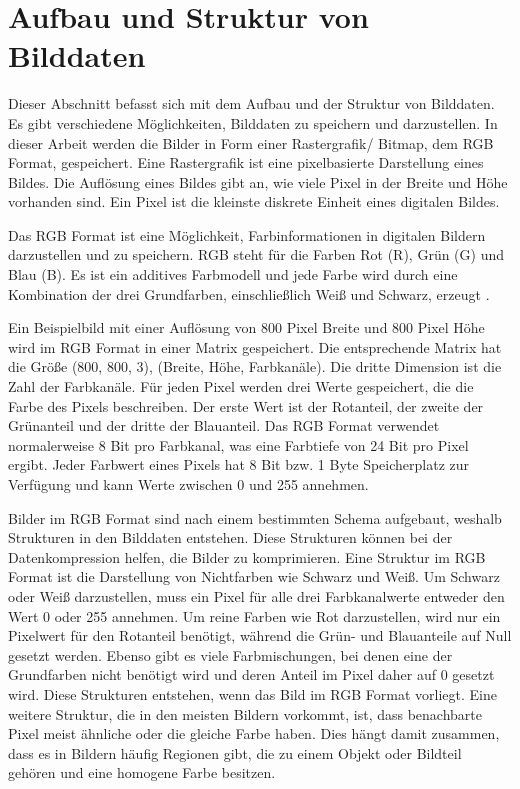 \documentclass[conference]{IEEEtran}
\begin{document}
\section{Aufbau und Struktur von Bilddaten}

Dieser Abschnitt befasst sich mit dem Aufbau und der Struktur von Bilddaten. 
Es gibt verschiedene Möglichkeiten, Bilddaten zu speichern und darzustellen. 
In dieser Arbeit werden die Bilder in Form einer Rastergrafik/ Bitmap, dem RGB Format, 
gespeichert. 
Eine Rastergrafik ist eine pixelbasierte Darstellung eines Bildes. 
Die Auflösung eines Bildes gibt an, wie viele Pixel in der Breite und Höhe vorhanden sind. 
Ein Pixel ist die kleinste diskrete Einheit eines digitalen Bildes. 

Das RGB Format ist eine Möglichkeit, Farbinformationen in digitalen Bildern darzustellen 
und zu speichern. 
RGB steht für die Farben Rot (R), Grün (G) und Blau (B). 
Es ist ein additives Farbmodell und jede Farbe wird durch eine Kombination der drei 
Grundfarben, einschließlich Weiß und Schwarz, erzeugt \cite{rite}.

Ein Beispielbild mit einer Auflösung von 800 Pixel Breite und 800 Pixel Höhe wird 
im RGB Format in einer Matrix gespeichert. 
Die entsprechende Matrix hat die Größe (800, 800, 3), (Breite, Höhe, Farbkanäle). 
Die dritte Dimension ist die Zahl der Farbkanäle. 
Für jeden Pixel werden drei Werte gespeichert, die die Farbe des Pixels beschreiben. 
Der erste Wert ist der Rotanteil, der zweite der Grünanteil und der dritte der Blauanteil. 
Das RGB Format verwendet normalerweise 8 Bit pro Farbkanal, was eine Farbtiefe von 24 Bit 
pro Pixel ergibt. 
Jeder Farbwert eines Pixels hat 8 Bit bzw. 1 Byte Speicherplatz zur Verfügung und 
kann Werte zwischen 0 und 255 annehmen.

Bilder im RGB Format sind nach einem bestimmten Schema aufgebaut, weshalb
Strukturen in den Bilddaten entstehen.
Diese Strukturen können bei der Datenkompression helfen, die Bilder zu komprimieren.
Eine Struktur im RGB Format ist die Darstellung von Nichtfarben
wie Schwarz und Weiß.
Um Schwarz oder Weiß darzustellen, muss ein Pixel für alle drei Farbkanalwerte entweder 
den Wert 0 oder 255 annehmen. 
Um reine Farben wie Rot darzustellen, wird nur ein Pixelwert für den Rotanteil 
benötigt, während die Grün- und Blauanteile auf Null gesetzt werden. 
Ebenso gibt es viele Farbmischungen, bei denen eine der Grundfarben nicht benötigt 
wird und deren Anteil im Pixel daher auf 0 gesetzt wird. 
Diese Strukturen entstehen, wenn das Bild im RGB Format vorliegt. 
Eine weitere Struktur, die in den meisten Bildern vorkommt, ist, dass benachbarte 
Pixel meist ähnliche oder die gleiche Farbe haben. 
Dies hängt damit zusammen, dass es in Bildern häufig Regionen gibt, die zu einem 
Objekt oder Bildteil gehören und eine homogene Farbe besitzen.
\end{document}
